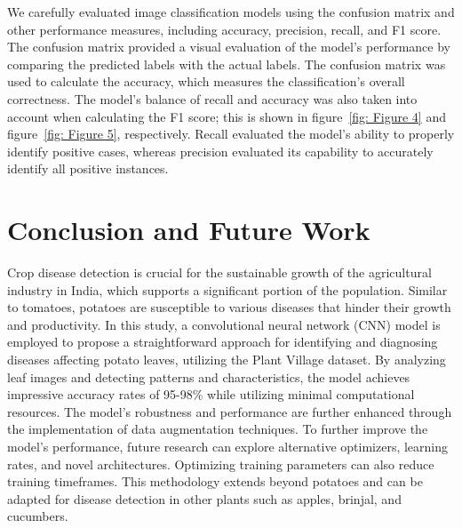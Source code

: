 \documentclass[conference]{IEEEtran}
\begin{document}
We carefully evaluated image classification models using the confusion matrix and other performance measures, including accuracy, precision, recall, and F1 score. The confusion matrix provided a visual evaluation of the model's performance by comparing the predicted labels with the actual labels. The confusion matrix was used to calculate the accuracy, which measures the classification's overall correctness. The model's balance of recall and accuracy was also taken into account when calculating the F1 score; this is shown in figure~\ref{fig: Figure 4} and figure~\ref{fig: Figure 5}, respectively. Recall evaluated the model's ability to properly identify positive cases, whereas precision evaluated its capability to accurately identify all positive instances.

  
\section{Conclusion and Future Work}
Crop disease detection is crucial for the sustainable growth of the agricultural industry in India, which supports a significant portion of the population. Similar to tomatoes, potatoes are susceptible to various diseases that hinder their growth and productivity. In this study, a convolutional neural network (CNN) model is employed to propose a straightforward approach for identifying and diagnosing diseases affecting potato leaves, utilizing the Plant Village dataset. By analyzing leaf images and detecting patterns and characteristics, the model achieves impressive accuracy rates of 95-98\% while utilizing minimal computational resources. The model's robustness and performance are further enhanced through the implementation of data augmentation techniques. To further improve the model's performance, future research can explore alternative optimizers, learning rates, and novel architectures. Optimizing training parameters can also reduce training timeframes. This methodology extends beyond potatoes and can be adapted for disease detection in other plants such as apples, brinjal, and cucumbers.



\end{document}
